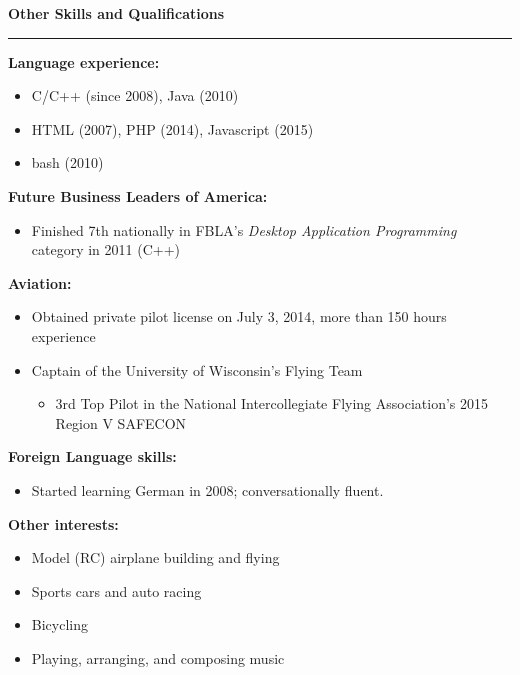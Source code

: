 \documentclass[12pt,letterpaper]{article}
\newenvironment{details}{
    \vspace{-.8em}
    \begin{itemize}
        \renewcommand \labelitemi{\labelitemiv}
        \setlength{\itemsep}{0pt}
        \setlength{\parskip}{-1pt}
        \setlength{\parsep}{0pt}
    }{
    \end{itemize}
    \vspace{-.5em}
}
\newcommand{\hr} {
    \vspace{-1em}
    \par\rule{\textwidth}{1pt}
    \vspace{-1.5em}
}
\newcommand{\ressection}[1] {
    \par{\large \textbf{#1}}
    \hr
}
\newenvironment{other} {
    \ressection{Other Skills and Qualifications}
    \setlength{\parskip}{3pt}
}{
    \vspace{0.5em}
}
\begin{document}
\begin{other}
\par \textbf{Language experience:}
\begin{details}
    \item C/C++ (since 2008), Java (2010)
    \item HTML (2007), PHP (2014), Javascript (2015)
    \item bash (2010)
\end{details}
\par \textbf{Future Business Leaders of America:}
\begin{details}
    \item Finished 7th nationally in FBLA's \textit{Desktop Application Programming} category in 2011 (C++)
\end{details}

\par \textbf{Aviation:}
\begin{details}
    \item Obtained private pilot license on July 3, 2014, more than 150 hours experience
    \item Captain of the University of Wisconsin's Flying Team
    \vspace{.5em}
    \begin{details}
        \item 3rd Top Pilot in the National Intercollegiate Flying Association's 2015 Region V SAFECON
    \end{details}
\end{details}

\par \textbf{Foreign Language skills:}
\begin{details}
    \item Started learning German in 2008; conversationally fluent.
\end{details}

\par \textbf{Other interests:}
\begin{details}
    \item Model (RC) airplane building and flying
    \item Sports cars and auto racing
    \item Bicycling
    \item Playing, arranging, and composing music
\end{details}

\end{other}
\end{document}
